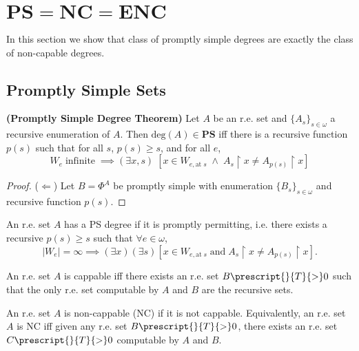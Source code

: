 \section{$\bm{PS}=\bm{NC}=\bm{ENC}$}
  In this section we show that class of promptly simple degrees are exactly
  the class of non-capable degrees.

\subsection{Promptly Simple Sets}
  \begin{theorem}
    \textbf{(Promptly Simple Degree Theorem)} Let $A$ be an r.e. set and
    $\{A_s\}_{s\in\omega}$ a recursive enumeration of $A$. Then
    $\text{deg}(A) \in\bm{PS}$ iff there is a recursive function $p(s)$ such
    that for all $s$, $p(s)\geq s$, and for all $e$,
    \begin{equation}
      W_e\; \text{infinite}\; \implies (\exists x,s)\; [x\in
      W_{e,\text{at}\; s}\; \wedge\; A_s\restriction x \neq
      A_{p(s)}\restriction x]
      \label{eqn:promptly-permit}
    \end{equation}
  \end{theorem}
  \begin{proof}
    ($\Leftarrow$) Let $B=\Phi^A$ be promptly simple with enumeration
    $\{B_s\}_{s\in\omega}$ and recursive function $p(s)$.
  \end{proof}

  \begin{recall}
    An r.e. set $A$ has a PS degree if it is promptly permitting, i.e.
    there exists a recursive $p(s)\geq s$ such that $\forall e\in\omega$,
    \[|W_e|=\infty \implies (\exists x)(\exists s) [x\in W_{e, \text{at}\;
    s}\; \text{and}\; A_s\restriction x \neq A_{p(s)}\restriction x].\]
  \end{recall}

  \begin{recall}
    An r.e. set $A$ is cappable iff there exists an r.e. set
    $B\prescript{}{T}{>}0$ such that the only r.e. set computable by $A$
    and $B$ are the recursive sets.
  \end{recall}

  \begin{recall}
    An r.e. set $A$ is non-cappable (NC) if it is not cappable.
    Equivalently, an r.e. set $A$ is NC iff given any r.e. set
    $B\prescript{}{T}{>}0$, there exists an r.e. set $C\prescript{}{T}{>}0$
    computable by $A$ and $B$.
  \end{recall}

